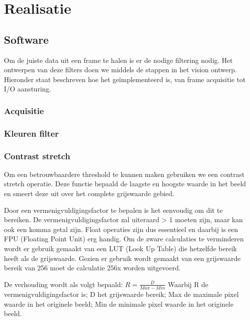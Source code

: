 \chapter{Realisatie}


\section{Software}
\label{sec:softreal}
Om de juiste data uit een frame te halen is er de nodige filtering nodig. 
Het ontwerpen van deze filters doen we middels de stappen in het vision ontwerp.
Hieronder staat beschreven hoe het geïmplementeerd is, van frame acquisitie tot 
I/O aansturing.

\subsection{Acquisitie}
\label{sub:acqreal}

\subsection{Kleuren filter}
\label{sub:kleurfilt}

\subsection{Contrast stretch}
\label{sub:contstr}
Om een betrouwbaardere threshold te kunnen maken gebruiken we een contrast stretch 
operatie. Deze functie bepaald de laagste en hoogste waarde in het beeld en smeert 
deze uit over het complete grijswaarde gebied.

Door een vermenigvuldigingsfactor te bepalen is het eenvoudig om dit te bereiken. De vermenigvuldigingsfactor zal uiteraard > 1 moeten zijn, maar kan ook een komma getal 
zijn. Float operaties zijn dus essentieel en daarbij is een FPU (Floating Point Unit) 
erg handig. Om de zware calculaties te verminderen wordt er gebruik gemaakt van een 
LUT (Look Up Table) die hetzelfde bereik heeft als de grijswaarde. Gezien er gebruik 
wordt gemaakt van een grijswaarde bereik van 256 moet de calculatie 256x worden 
uitgevoerd.

De verhouding wordt als volgt bepaald:
$R = \frac{D}{Max - Min}$
Waarbij R de vermenigvuldigingsfactor is;
D het grijswaarde bereik;
Max de maximale pixel waarde in het originele beeld;
Min de minimale pixel waarde in het originele beeld.

